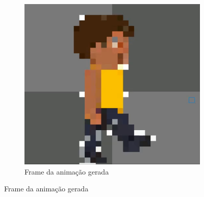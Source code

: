 \begin{figure}[htbp]
\begin{subfigure}{0.35\linewidth}
        \includegraphics[width=1\linewidth]{figs/pixelLab/dia3/print7.PNG}
        \caption{\small Frame da animação gerada}
        \label{fig:pixelLabAnimacao6b}
    \end{subfigure}
\end{figure}

